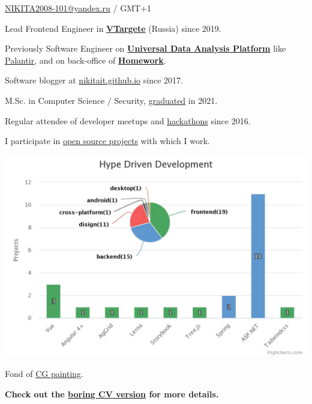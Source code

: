 \documentclass{yb}
\begin{document}
\ybPrintPhoto{}

{\scshape\bfseries\Large {}}\newline
\href{mailto:NIKITA2008-101@yandex.ru}{NIKITA2008-101@yandex.ru} / GMT+1

\vspace*{1em}

Lead Frontend Engineer in \href{https://vtargete.ru/}{\textbf{VTargete}} (Russia) \newline
since 2019.

\vspace*{1em}

Previously Software Engineer on \textbf{\href{https://baltinfocom.ru/BigData\#en}{Universal Data Analysis Platform}} like \href{https://www.palantir.com/}{Palantir}, and on back-office of \textbf{\href{https://homework.ru}{Homework}}.

Software blogger at \href{https://nikitait.github.io/}{nikitait.github.io} since 2017.

M.Sc. in Computer Science / Security, \href{https://etu.ru/en/university/}{graduated} in 2021.

Regular attendee of developer meetups and \href{https://www.youtube.com/watch?v=gVKDU043EWI&t=1s&ab_channel=EPAMSaint-Petersburg}{hackathons} since 2016.

I participate in \href{https://github.com/nikitait}{open source projects} with which I work.

\includegraphics[width=\textwidth]{./hype-driven-development.jpeg}

Fond of \href{https://www.artstation.com/nikitait}{CG painting}.

\textbf{Check out the \href{https://texlive2020.latexonline.cc/compile?git=https://github.com/NikitaIT/cv&target=resume-boring.tex&command=pdflatex}{boring CV version} for more details.}
\end{document}
